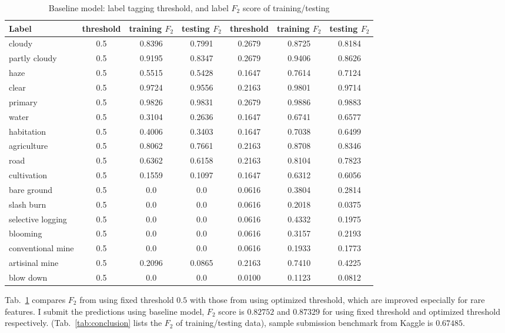 \documentclass[11pt,oneside,a4paper]{article}
\begin{document}
\begin{table}[ht]
\scriptsize
\begin{tabular}{l|c|c|c|c|c|c}
\hline
\hline
Label      & threshold & training $F_2$ & testing $F_2$ & threshold & training $F_2$ & testing $F_2$ \\\hline
cloudy            & 0.5  & 0.8396 & 0.7991 & 0.2679  & 0.8725 & 0.8184 \\ 
partly cloudy     & 0.5  & 0.9195 & 0.8347 & 0.2679  & 0.9406 & 0.8626 \\  
haze              & 0.5  & 0.5515 & 0.5428 & 0.1647  & 0.7614 & 0.7124 \\
clear             & 0.5  & 0.9724 & 0.9556 & 0.2163  & 0.9801 & 0.9714 \\
primary           & 0.5  & 0.9826 & 0.9831 & 0.2679  & 0.9886 & 0.9883 \\
water             & 0.5  & 0.3104 & 0.2636 & 0.1647  & 0.6741 & 0.6577 \\
habitation        & 0.5  & 0.4006 & 0.3403 & 0.1647  & 0.7038 & 0.6499 \\
agriculture       & 0.5  & 0.8062 & 0.7661 & 0.2163  & 0.8708 & 0.8346 \\
road              & 0.5  & 0.6362 & 0.6158 & 0.2163  & 0.8104 & 0.7823 \\
cultivation       & 0.5  & 0.1559 & 0.1097 & 0.1647  & 0.6312 & 0.6056 \\
bare ground       & 0.5  & 0.0    & 0.0    & 0.0616  & 0.3804 & 0.2814 \\
slash burn        & 0.5  & 0.0    & 0.0    & 0.0616  & 0.2018 & 0.0375 \\
selective logging & 0.5  & 0.0    & 0.0    & 0.0616  & 0.4332 & 0.1975 \\
blooming          & 0.5  & 0.0    & 0.0    & 0.0616  & 0.3157 & 0.2193 \\
conventional mine & 0.5  & 0.0    & 0.0    & 0.0616  & 0.1933 & 0.1773 \\
artisinal mine    & 0.5  & 0.2096 & 0.0865 & 0.2163  & 0.7410 & 0.4225 \\
blow down         & 0.5  & 0.0    & 0.0    & 0.0100  & 0.1123 & 0.0812 \\ \hline
\end{tabular}
\caption{Baseline model: label tagging threshold, and label $F_2$ score of training/testing}\label{tab:baseline_f2}
\end{table}

Tab.~\ref{tab:baseline_f2} compares $F_2$ from using fixed threshold $0.5$ with those from using optimized threshold, which are improved especially for rare features. I submit the predictions using baseline model, $F_2$ score is $0.82752$ and $0.87329$ for using fixed threshold and optimized threshold respectively. (Tab.~\ref{tab:conclusion} lists the $F_2$ of training/testing data), sample submission benchmark from Kaggle is $0.67485$. 
\end{document}
